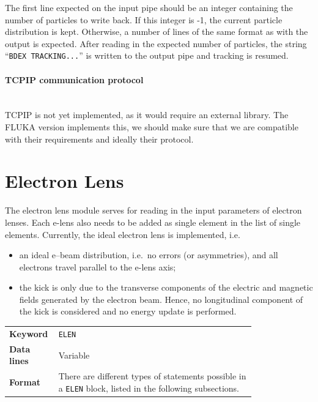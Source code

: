 The first line expected on the input pipe should be an integer containing the number of particles to write back.
If this integer is -1, the current particle distribution is kept.
Otherwise, a number of lines of the same format as with the output is expected.
After reading in the expected number of particles, the string ``\texttt{BDEX TRACKING...}'' is written to the output pipe and tracking is resumed.

\paragraph{TCPIP communication protocol}~\\

TCPIP is not yet implemented, as it would require an external library.
The FLUKA version implements this, we should make sure that we are compatible with their requirements and ideally their protocol.

\section{Electron Lens} \label{sec:elen}

The electron lens module serves for reading in the input parameters of electron lenses.
Each e-lens also needs to be added as single element in the list of single elements.
Currently, the ideal electron lens is implemented, i.e.
\begin{itemize}
\item an ideal e--beam distribution, i.e.~no errors (or asymmetries), and all electrons travel parallel to the e-lens axis;
\item the kick is only due to the transverse components of the electric and magnetic fields generated by the electron beam.
  Hence, no longitudinal component of the kick is considered and no energy update is performed.
\end{itemize}

\bigskip
\begin{tabular}{@{}lp{0.8\linewidth}}
    \textbf{Keyword}    & \texttt{ELEN}\index{ELEN} \\
    \textbf{Data lines} & Variable \\
    \textbf{Format}     & There are different types of statements possible in a \texttt{ELEN} block, listed in the following subsections. \\
\end{tabular}

